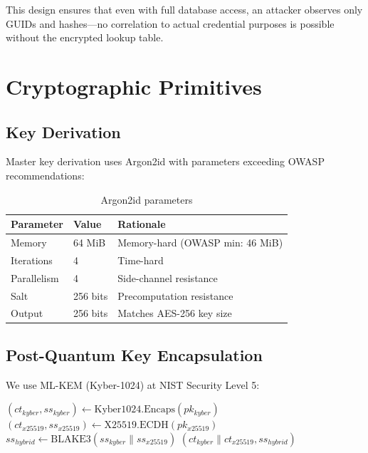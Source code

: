 \documentclass[11pt,a4paper]{article}
\begin{document}
This design ensures that even with full database access, an attacker observes only GUIDs and hashes---no correlation to actual credential purposes is possible without the encrypted lookup table.

\section{Cryptographic Primitives}

\subsection{Key Derivation}

Master key derivation uses Argon2id with parameters exceeding OWASP recommendations:

\begin{table}[h]
\centering
\begin{tabular}{@{}lll@{}}
\toprule
Parameter & Value & Rationale \\
\midrule
Memory & 64 MiB & Memory-hard (OWASP min: 46 MiB) \\
Iterations & 4 & Time-hard \\
Parallelism & 4 & Side-channel resistance \\
Salt & 256 bits & Precomputation resistance \\
Output & 256 bits & Matches AES-256 key size \\
\bottomrule
\end{tabular}
\caption{Argon2id parameters}
\end{table}

\subsection{Post-Quantum Key Encapsulation}

We use ML-KEM (Kyber-1024) at NIST Security Level 5:

\begin{algorithm}
\caption{Hybrid Key Encapsulation}
\begin{algorithmic}[1]
    \State $(ct_{kyber}, ss_{kyber}) \gets \text{Kyber1024.Encaps}(pk_{kyber})$
    \State $(ct_{x25519}, ss_{x25519}) \gets \text{X25519.ECDH}(pk_{x25519})$
    \State $ss_{hybrid} \gets \text{BLAKE3}(ss_{kyber} \| ss_{x25519})$
    \State \Return $(ct_{kyber} \| ct_{x25519}, ss_{hybrid})$
\EndFunction
\end{algorithmic}
\end{algorithm}
\end{document}
